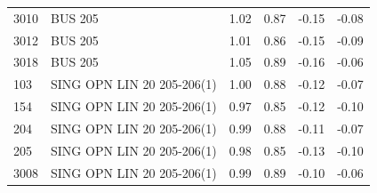 \documentclass[10pt]{report}
\begin{document}
\begin{table}[H]
{\begin{tabular}{llrrrr}
3010 & BUS 205 & 1.02 & 0.87 & -0.15 & -0.08 \\
3012 & BUS 205 & 1.01 & 0.86 & -0.15 & -0.09 \\
3018 & BUS 205 & 1.05 & 0.89 & -0.16 & -0.06 \\
103 & SING OPN LIN   20 205-206(1) & 1.00 & 0.88 & -0.12 & -0.07 \\
154 & SING OPN LIN   20 205-206(1) & 0.97 & 0.85 & -0.12 & -0.10 \\
204 & SING OPN LIN   20 205-206(1) & 0.99 & 0.88 & -0.11 & -0.07 \\
205 & SING OPN LIN   20 205-206(1) & 0.98 & 0.85 & -0.13 & -0.10 \\
3008 & SING OPN LIN   20 205-206(1) & 0.99 & 0.89 & -0.10 & -0.06 \\
\bottomrule
\end{tabular}}
\end{table}
\end{document}
